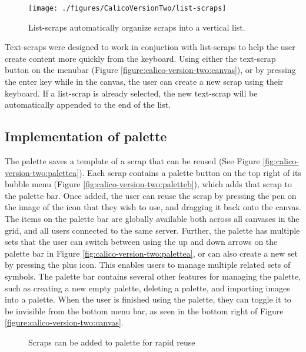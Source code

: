 \begin{figure*}[tbh]
  \centering
  \texttt{[image: ./figures/CalicoVersionTwo/list-scraps]}
  \caption{List-scraps automatically organize scraps into a vertical list.}
  \label{figure:calico-version-two:list-scraps}
\end{figure*}

Text-scraps were designed to work in conjuction with list-scraps to help the user create content more quickly from the keyboard. Using either the text-scrap button on the menubar (Figure \ref{figure:calico-version-two:canvas}), or by pressing the enter key while in the canvas, the user can create a new scrap using their keyboard. If a list-scrap is already selected, the new text-scrap will be automatically appended to the end of the list.

\subsection{Implementation of palette}

The palette saves a template of a scrap that can be reused (See Figure \ref{fig:calico-version-two:palettea}). Each scrap contains a palette button on the top right of its bubble menu (Figure \ref{fig:calico-version-two:paletteb}), which adds that scrap to the palette bar. Once added, the user can reuse the scrap by pressing the pen on the image of the icon that they wish to use, and dragging it back onto the canvas. The items on the palette bar are globally available both across all canvases in the grid, and all users connected to the same server. Further, the palette has multiple sets that the user can switch between using the up and down arrows on the palette bar in Figure \ref{fig:calico-version-two:palettea}, or can also create a new set by pressing the plus icon. This enables users to manage multiple related sets of symbols. The palette bar contains several other features for managing the palette, such as creating a new empty palette, deleting a palette, and importing images into a palette. When the user is finished using the palette, they can toggle it to be invisible from the bottom menu bar, as seen in the bottom right of Figure \ref{figure:calico-version-two:canvas}.

\begin{figure}
  \centering
   \caption {Scraps can be added to palette for rapid reuse}
   \label{fig:calico-version-two:palette}
\end{figure}

